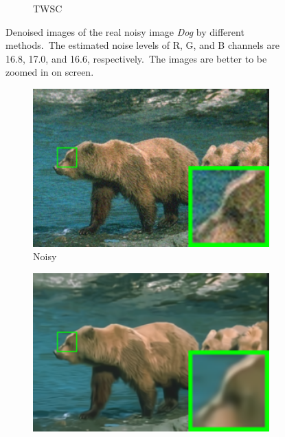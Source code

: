 \begin{figure}
\begin{subfigure}[t]{0.24\textwidth}
		\caption{TWSC}
    \end{subfigure}
    \caption{Denoised images of the real noisy image \textsl{Dog} \cite{ncwebsite} by different methods.\ The estimated noise levels of R, G, and B channels are 16.8, 17.0, and 16.6, respectively.\ The images are better to be zoomed in on screen.}
    \label{fig5-7}
\end{figure}


\begin{figure}
    \centering
    \begin{subfigure}[t]{0.24\textwidth}
        \centering
        \includegraphics[width=1\textwidth]{images/twsc/nc/resize_br_Noisy_bears.png}
		\caption{Noisy}
    \end{subfigure}
    \hfill
    \begin{subfigure}[t]{0.24\textwidth}
        \centering
        \includegraphics[width=1\textwidth]{images/twsc/nc/resize_br_CBM3D_bears.png}

\end{subfigure}
\end{figure}
